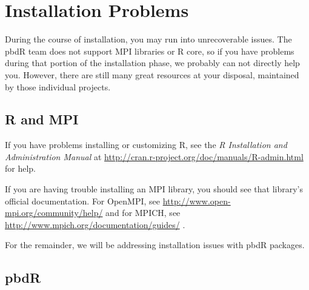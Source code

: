 \section{Installation Problems}

During the course of installation, you may run into unrecoverable issues.  The pbdR team does not support MPI libraries or R core, so if you have problems during that portion of the installation phase, we probably can not directly help you.  However, there are still many great resources at your disposal, maintained by those individual projects.

\subsection{R and MPI}

If you have problems installing or customizing R, see the \emph{R Installation and Administration Manual} at \url{http://cran.r-project.org/doc/manuals/R-admin.html} for help.

If you are having trouble installing an MPI library, you should see that library's official documentation.  For OpenMPI, see \url{http://www.open-mpi.org/community/help/} and for MPICH, see \url{http://www.mpich.org/documentation/guides/} .

For the remainder, we will be addressing installation issues with pbdR packages.

\subsection{pbdR}

